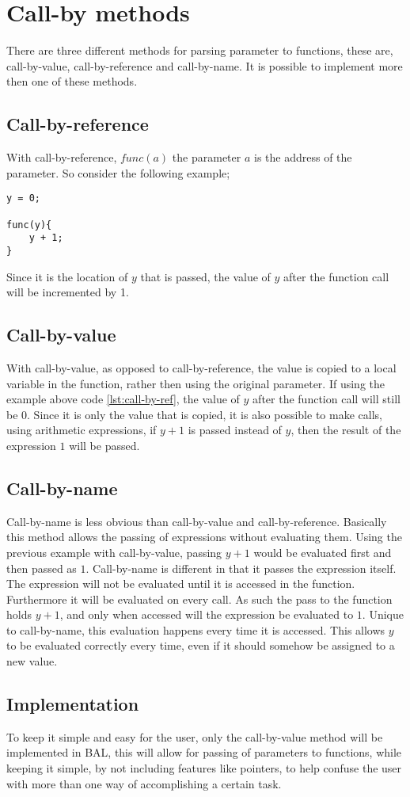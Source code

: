 \section{Call-by methods}
There are three different methods for parsing parameter to functions, these are, call-by-value, call-by-reference and call-by-name. It is possible to implement more then one of these methods.
\subsection*{Call-by-reference}
With call-by-reference, $func(a)$ the parameter $a$ is the address of the parameter. So consider the following example;
\begin{lstlisting}[caption=call-by-reference example, label=lst:call-by-ref]
y = 0;

func(y){
	y + 1;
}
\end{lstlisting}
Since it is the location of $y$ that is passed, the value of $y$ after the function call will be incremented by 1.
\subsection*{Call-by-value}
With call-by-value, as opposed to call-by-reference, the value is copied to a local variable in the function, rather then using the original parameter. If using the example above code \ref{lst:call-by-ref}, the value of $y$ after the function call will still be $0$. Since it is only the value that  is copied, it is also possible to make calls, using arithmetic expressions, if $y+1$ is passed instead of $y$, then the result of the expression $1$ will be passed.
\subsection*{Call-by-name}
Call-by-name is less obvious than call-by-value and call-by-reference. Basically this method allows the passing of expressions without evaluating them. Using the previous example with call-by-value, passing $y+1$ would be evaluated first and then passed as $1$. Call-by-name is different in that it passes the expression itself. The expression will not be evaluated until it is accessed in the function. Furthermore it will be evaluated on every call. As such the pass to the function holds $y+1$, and only when accessed will the expression be evaluated to $1$. Unique to call-by-name, this evaluation happens every time it is accessed. This allows $y$ to be evaluated correctly every time, even if it should somehow be assigned to a new value.
\subsection*{Implementation}To keep it simple and easy for the user, only the call-by-value method will be implemented in BAL, this will allow for passing of parameters to functions, while keeping it simple, by not including features like pointers, to help confuse the user with more than one way of accomplishing a certain task.

